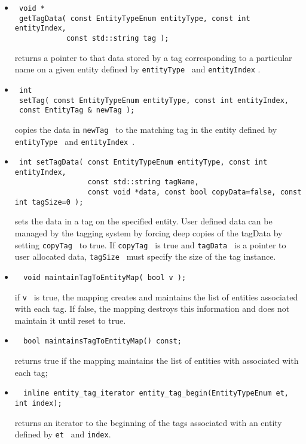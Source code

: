 \begin{itemize}
\item \begin{verbatim} 
 void * 
 getTagData( const EntityTypeEnum entityType, const int entityIndex, 
            const std::string tag ); \end{verbatim} 
returns a pointer to
that data stored by a tag corresponding to a particular name on a
given entity defined by {\tt entityType } and {\tt entityIndex} .

\item \begin{verbatim}  
 int 
 setTag( const EntityTypeEnum entityType, const int entityIndex, 
 const EntityTag & newTag ); \end{verbatim}
copies the data in {\tt newTag } to the matching tag in the entity defined by {\tt entityType } and  {\tt entityIndex }.

\item \begin{verbatim}  
 int setTagData( const EntityTypeEnum entityType, const int entityIndex, 
                 const std::string tagName, 
                 const void *data, const bool copyData=false, const int tagSize=0 ); \end{verbatim}
sets the data in a tag on the specified entity.  User defined data can be managed by the tagging system by
forcing deep copies of the tagData by setting {\tt copyTag } to true.  If {\tt copyTag } is true and {\tt tagData }
is a pointer to user allocated data, {\tt tagSize } must specify the size of the tag instance.
  
\item \begin{verbatim}  void maintainTagToEntityMap( bool v ); \end{verbatim}
if {\tt v } is true, the mapping creates and maintains the list of entities associated with each tag.  If false,
the mapping destroys this information and does not maintain it until reset to true.

\item \begin{verbatim}  bool maintainsTagToEntityMap() const; \end{verbatim}
returns true if the mapping maintains the list of entities with associated with each tag;

\item \begin{verbatim}  inline entity_tag_iterator entity_tag_begin(EntityTypeEnum et, int index); \end{verbatim}
returns an iterator to the beginning of the tags associated with an entity defined by {\tt et } and {\tt index}.


\end{itemize}
